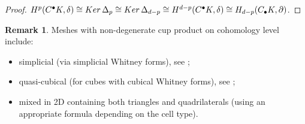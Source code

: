 \documentclass{elsarticle}
\theoremstyle{definition}
\newtheorem{remark}[theorem]{Remark}
\newcommand{\Ker}{\mathop{\rm Ker}\nolimits}
\begin{document}
\begin{proof}
  $H^p(C^{\bullet} K, \delta)
    \cong \Ker \Delta_p
    \cong \Ker \Delta_{d - p}
    \cong H^{d - p}(C^{\bullet} K, \delta)
    \cong H_{d - p}(C_{\bullet} K, \partial)$.
\end{proof}
\begin{remark}
  Meshes with non-degenerate cup product on cohomology level include:
  \begin{itemize}
    \item
      simplicial (via simplicial Whitney forms), see \cite{wilson2007cochain};
    \item
      quasi-cubical (for cubes with cubical Whitney forms),
      see \cite{arnold2012discrete};
    \item
      mixed in 2D containing both triangles and quadrilaterals (using an appropriate formula depending on the cell type).
  \end{itemize}
\end{remark}

% 
% 
\end{document}
